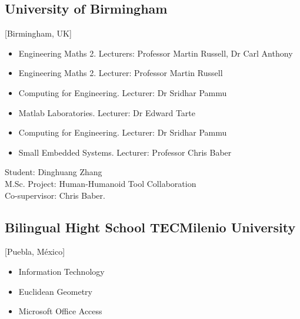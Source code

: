 \documentclass{mycv}
\begin{document}
\subsection{University of Birmingham}[Birmingham, UK]
\begin{positions}
\end{positions}
\begin{itemize}
	\item Engineering Maths 2. Lecturers: Professor Martin Russell, Dr Carl Anthony 
	\item Engineering Maths 2. Lecturer: Professor Martin Russell 
	\item Computing for Engineering. Lecturer: Dr Sridhar Pammu  
	\item Matlab Laboratories. Lecturer: Dr Edward Tarte  
	\item Computing for Engineering. Lecturer: Dr Sridhar Pammu  
	\item Small Embedded Systems. Lecturer: Professor Chris Baber   \\
\end{itemize}

\begin{positions}
\end{positions}
Student: Dinghuang Zhang \\
M.Sc. Project: Human-Humanoid Tool Collaboration \\
Co-supervisor: Chris Baber. 

\subsection{Bilingual Hight School TECMilenio University}[Puebla, M\'exico]
\begin{positions}
\end{positions}
\begin{itemize}
	\item Information Technology \href{https://sites.google.com/site/perezxochicale/teaching/iit}{\faExternalLink}
	\item Euclidean Geometry  \href{https://sites.google.com/site/perezxochicale/teaching/euclidean-geometry}{\faExternalLink}
	\item Microsoft Office Access \href{https://sites.google.com/site/perezxochicale/teaching/moa}{\faExternalLink}
\end{itemize}
\end{document}
